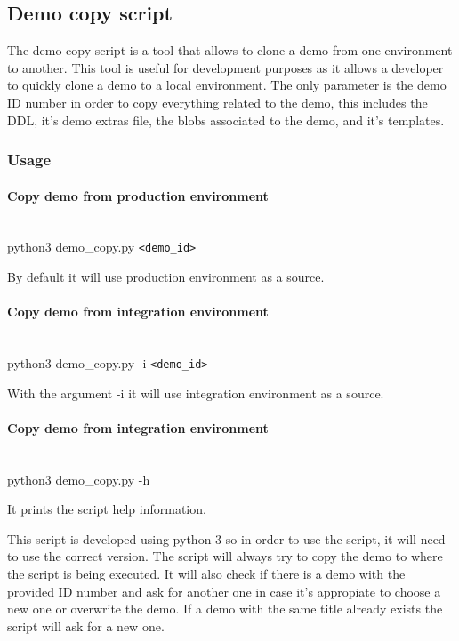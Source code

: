 \subsection{Demo copy script}

The demo copy script is a tool that allows to clone a demo from one environment to another. This tool is useful for development purposes
as it allows a developer to quickly clone a demo to a local environment. The only parameter is the demo ID number in order to copy
everything related to the demo, this includes the DDL, it's demo extras file, the blobs associated to the demo, and it's templates.

\subsubsection{Usage}
\paragraph{Copy demo from production environment} \hspace{0pt} \\
python3 demo\_copy.py {\tt <demo\_id>}

By default it will use production environment as a source.

\paragraph{Copy demo from integration environment} \hspace{0pt} \\
python3 demo\_copy.py -i {\tt <demo\_id>}

With the argument -i it will use integration environment as a source.

\paragraph{Copy demo from integration environment} \hspace{0pt} \\
python3 demo\_copy.py -h

It prints the script help information.


This script is developed using python 3 so in order to use the script, it will need to use the correct version.
The script will always try to copy the demo to where the script is being executed. It will also check if there is a demo with the provided
ID number and ask for another one in case it's appropiate to choose a new one or overwrite the demo. If a demo with the same title already
exists the script will ask for a new one.